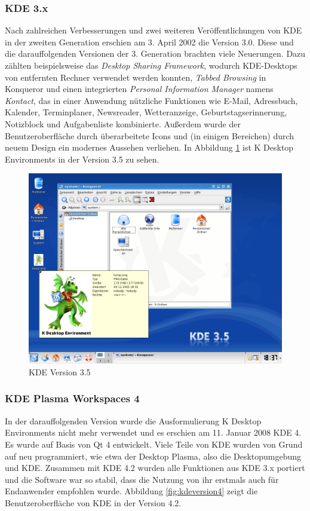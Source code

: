 \subsubsection{KDE 3.x}
Nach zahlreichen Verbesserungen und zwei weiteren Veröffentlichungen von KDE in der zweiten Generation erschien am 3. April 2002 die Version 3.0. Diese und die darauffolgenden Versionen der 3. Generation brachten viele Neuerungen. Dazu zählten beispielsweise das \textit{Desktop Sharing Framework}, wodurch KDE-Desktops von entfernten Rechner verwendet werden konnten, \textit{Tabbed Browsing} in Konqueror und einen integrierten \textit{Personal Information Manager} namens \textit{Kontact}, das in einer Anwendung nützliche Funktionen wie E-Mail, Adressbuch, Kalender, Terminplaner, Newsreader, Wetteranzeige, Geburtstagserinnerung, Notizblock und Aufgabenliste kombinierte. Außerdem wurde der Benutzeroberfläche durch überarbeitete Icons und (in einigen Bereichen) durch neuem Design ein modernes Aussehen verliehen. \cite{kdeversionenwiki, geschichtekde} In Abbildung \ref{fig:kdeversion3} ist K Desktop Environments in der Version 3.5 zu sehen.

\begin{figure}[h]
	\centering
	\includegraphics[width=\linewidth]{images/KDE_35.png}
	\caption{KDE Version 3.5 \cite{kdeversionenwiki}}
	\label{fig:kdeversion3}
\end{figure}

\subsubsection{KDE Plasma Workspaces 4}
In der darauffolgenden Version wurde die Ausformulierung K Desktop Environments nicht mehr verwendet und es erschien am  11. Januar 2008 KDE 4. Es wurde auf Basis von Qt 4 entwickelt. Viele Teile von KDE wurden von Grund auf neu programmiert, wie etwa der Desktop Plasma, also die Desktopumgebung und KDE. Zusammen mit KDE 4.2 wurden alle Funktionen aus KDE 3.x portiert und die Software war so stabil, dass die Nutzung von ihr erstmals auch für Endanwender empfohlen wurde. \cite{geschichtekde} Abbildung \ref{fig:kdeversion4} zeigt die Benutzeroberfläche von KDE in der Version 4.2.

